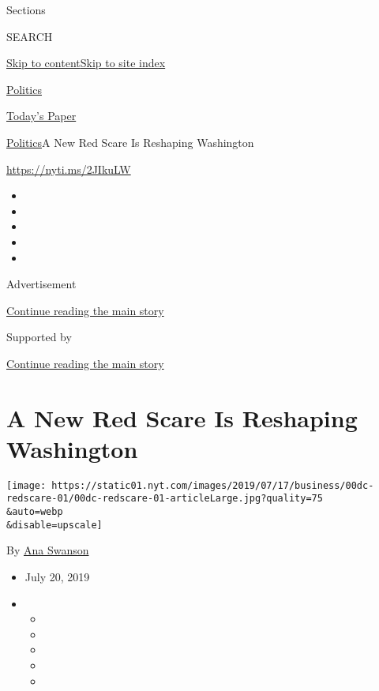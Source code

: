 Sections

SEARCH

\protect\hyperlink{site-content}{Skip to
content}\protect\hyperlink{site-index}{Skip to site index}

\href{https://www.nytimes.com/section/politics}{Politics}

\href{https://myaccount.nytimes.com/auth/login?response_type=cookie\&client_id=vi}{}

\href{https://www.nytimes.com/section/todayspaper}{Today's Paper}

\href{/section/politics}{Politics}\textbar{}A New Red Scare Is Reshaping
Washington

\url{https://nyti.ms/2JIkuLW}

\begin{itemize}
\item
\item
\item
\item
\item
\end{itemize}

Advertisement

\protect\hyperlink{after-top}{Continue reading the main story}

Supported by

\protect\hyperlink{after-sponsor}{Continue reading the main story}

\hypertarget{a-new-red-scare-is-reshaping-washington}{%
\section{A New Red Scare Is Reshaping
Washington}\label{a-new-red-scare-is-reshaping-washington}}

\texttt{[image: https://static01.nyt.com/images/2019/07/17/business/00dc-redscare-01/00dc-redscare-01-articleLarge.jpg?quality=75\\\&auto=webp\\\&disable=upscale]}

By \href{https://www.nytimes.com/by/ana-swanson}{Ana Swanson}

\begin{itemize}
\item
  July 20, 2019
\item
  \begin{itemize}
  \item
  \item
  \item
  \item
  \item
  \end{itemize}
\end{itemize}

